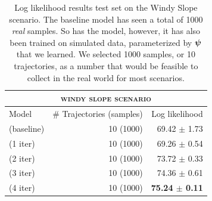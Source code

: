 \begin{table}
\centering

\begin{tabular}{lrr}
\multicolumn{3}{c}{\textsc{windy slope scenario}} \\
\toprule
Model & \# Trajectories (samples) & Log likelihood  \\
\midrule

\cvae{} (baseline) & 10 (1000) & 69.42 $\pm$ 1.73\\


\dettostoc{} (1 iter) & 10 (1000) & 69.26 $\pm$ 0.54 \\
\dettostoc{} (2 iter) & 10 (1000) & 73.72 $\pm$ 0.33 \\
\dettostoc{} (3 iter) & 10 (1000) & 74.36 $\pm$ 0.61 \\

\dettostoc{} (4 iter) & 10 (1000) & \textbf{75.24 $\pm$ 0.11} \\

\bottomrule
\end{tabular}
\bigskip

\caption{Log likelihood results test set on the Windy Slope scenario. The baseline model has seen a total of 1000 \emph{real} samples. So has the \dettostoc{} model, however, it has also been trained on simulated data, parameterized by $\boldsymbol{\psi}$ that we learned. We selected 1000 samples, or 10 trajectories, as a number that would be feasible to collect in the real world for most scenarios.}
\label{fig:windyslope_logprob}
\end{table}

